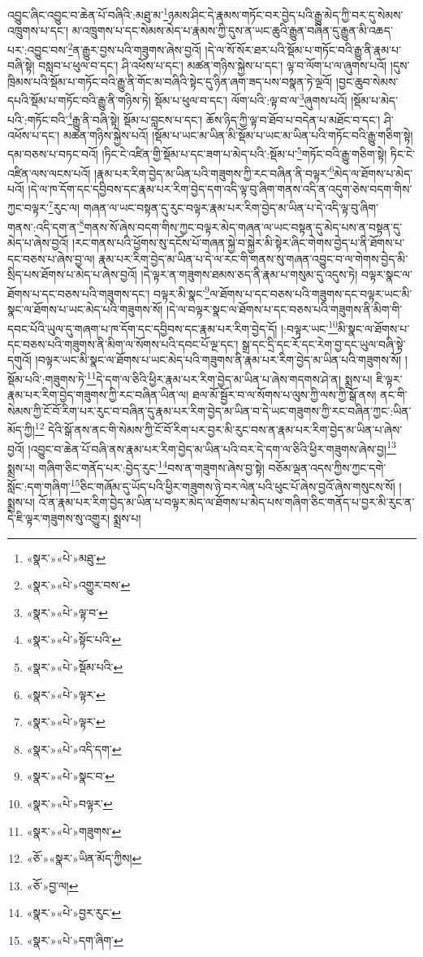 འབྱུང་ཞིང་འབྱུང་བ་ཆེན་པོ་བཞིའི་:མཐུ་མ་\footnote{«སྣར་»«པེ་»མཐུ་}ཉམས་ཤིང་དེ་རྣམས་གཏོང་བར་བྱེད་པའི་རྒྱུ་མེད་ཀྱི་བར་དུ་སེམས་འཁྲུགས་པ་དང་། མ་འཁྲུགས་པ་དང་སེམས་མེད་པ་རྣམས་ཀྱི་དུས་ན་ཡང་ཆུའི་རྒྱུན་བཞིན་དུ་རྒྱུན་མི་འཆད་པར་:འབྱུང་བས་\footnote{«སྣར་»«པེ་»འགྱུར་བས་}ན་རྒྱུར་བྱས་པའི་གཟུགས་ཞེས་བྱའོ། །དེ་ལ་སོ་སོར་ཐར་པའི་སྡོམ་པ་གཏོང་བའི་རྒྱུ་ནི་རྣམ་པ་བཞི་སྟེ། བསླབ་པ་ཕུལ་བ་དང་། ཤི་འཕོས་པ་དང་། མཚན་གཉིས་སྐྱེས་པ་དང་། ལྟ་བ་ལོག་པ་ལ་ཞུགས་པའོ། །དུས་ཁྲིམས་པའི་སྡོམ་པ་གཏོང་བའི་རྒྱུ་ནི་གོང་མ་བཞིའི་སྟེང་དུ་ཉིན་ཞག་ཟད་པས་བསྣན་ཏེ་ལྔའོ། །བྱང་ཆུབ་སེམས་དཔའི་སྡོམ་པ་གཏོང་བའི་རྒྱུ་ནི་གཉིས་ཏེ། སྡོམ་པ་ཕུལ་བ་དང་། ལོག་པའི་:ལྟ་བ་ལ་\footnote{«སྣར་»«པེ་»ལྟ་བ་}ཞུགས་པའོ། །སྡོམ་པ་མེད་པའི་:གཏོང་བའི་\footnote{«སྣར་»«པེ་»སྟོང་པའི་}རྒྱུ་ནི་བཞི་སྟེ། སྡོམ་པ་བླངས་པ་དང་། ཆོས་ཉིད་ཀྱི་ལྟ་བ་ཐོབ་པ་བདེན་པ་མཐོང་བ་དང་། ཤི་འཕོས་པ་དང་། མཚན་གཉིས་སྐྱེས་པའོ། །སྡོམ་པ་ཡང་མ་ཡིན་མི་སྡོམ་པ་ཡང་མ་ཡིན་པའི་གཏོང་བའི་རྒྱུ་གཅིག་སྟེ། དམ་བཅས་པ་བཏང་བའོ། །ཏིང་ངེ་འཛིན་གྱི་སྡོམ་པ་དང་ཟག་པ་མེད་པའི་:སྡོམ་པ་\footnote{«སྣར་»«པེ་»སྡོམ་པའི་}གཏོང་བའི་རྒྱུ་གཅིག་སྟེ། ཏིང་ངེ་འཛིན་ལས་ལངས་པའོ། །རྣམ་པར་རིག་བྱེད་མ་ཡིན་པའི་གཟུགས་ཀྱི་རང་བཞིན་ནི་བལྟར་\footnote{«སྣར་»«པེ་»ལྟར་}མེད་ལ་ཐོགས་པ་མེད་པའོ། །དེ་ལ་ཁ་དོག་དང་དབྱིབས་དང་རྣམ་པར་རིག་བྱེད་དག་འདི་ལྟ་བུ་ཞིག་གནས་འདི་ན་འདུག་ཅེས་བདག་གིས་ཀྱང་བལྟར་\footnote{«སྣར་»«པེ་»ལྟར་}རུང་ལ། གཞན་ལ་ཡང་བསྟན་དུ་རུང་བལྟར་རྣམ་པར་རིག་བྱེད་མ་ཡིན་པ་དེ་འདི་ལྟ་བུ་ཞིག་གནས་:འདི་དག་ན་\footnote{«སྣར་»«པེ་»འདི་དག་}གནས་སོ་ཞེས་བདག་གིས་ཀྱང་བལྟར་མེད་གཞན་ལ་ཡང་བསྟན་དུ་མེད་པས་ན་བསྟན་དུ་མེད་པ་ཞེས་བྱའོ། །རང་གནས་པའི་ཕྱོགས་སུ་དངོས་པོ་གཞན་སྐྱེ་བ་སྐྱེར་མི་སྟེར་ཞིང་གེགས་བྱེད་པ་ནི་ཐོགས་པ་དང་བཅས་པ་ཞེས་བྱ་ལ། རྣམ་པར་རིག་བྱེད་མ་ཡིན་པ་དེ་ལ་རང་གི་གནས་སུ་གཞན་འབྱུང་བ་ལ་གེགས་བྱེད་མི་སྲིད་པས་ཐོགས་པ་མེད་པ་ཞེས་བྱའོ། །དེ་ལྟར་ན་གཟུགས་ཐམས་ཅད་ནི་རྣམ་པ་གསུམ་དུ་འདུས་ཏེ། བལྟར་སྣང་ལ་ཐོགས་པ་དང་བཅས་པའི་གཟུགས་དང་། བལྟར་མི་སྣང་\footnote{«སྣར་»«པེ་»སྣང་བ་}ལ་ཐོགས་པ་དང་བཅས་པའི་གཟུགས་དང་བལྟར་ཡང་མི་སྣང་ལ་ཐོགས་པ་ཡང་མེད་པའི་གཟུགས་སོ། །དེ་ལ་བལྟར་སྣང་ལ་ཐོགས་པ་དང་བཅས་པའི་གཟུགས་ནི་མིག་གི་དབང་པོའི་ཡུལ་དུ་གཞག་པ་ཁ་དོག་དང་དབྱིབས་དང་རྣམ་པར་རིག་བྱེད་དོ། །:བལྟར་ཡང་\footnote{«སྣར་»«པེ་»བལྟར་}མི་སྣང་ལ་ཐོགས་པ་དང་བཅས་པའི་གཟུགས་ནི་མིག་ལ་སོགས་པའི་དབང་པོ་ལྔ་དང་། སྒྲ་དང་དྲི་དང་རོ་དང་རེག་བྱ་དང་ཡུལ་བཞི་སྟེ་དགུའོ། །བལྟར་ཡང་མི་སྣང་ལ་ཐོགས་པ་ཡང་མེད་པའི་གཟུགས་ནི་རྣམ་པར་རིག་བྱེད་མ་ཡིན་པའི་གཟུགས་སོ། །སྡོམ་པའི་:གཟུགས་ཏེ་\footnote{«སྣར་»«པེ་»གཟུགས་}དེ་དག་ལ་ཅིའི་ཕྱིར་རྣམ་པར་རིག་བྱེད་མ་ཡིན་པ་ཞེས་གདགས་ཤེ་ན། སྨྲས་པ། ཇི་ལྟར་རྣམ་པར་རིག་བྱེད་གཟུགས་ཀྱི་རང་བཞིན་ཡིན་ལ། ཐལ་མོ་སྦྱོར་བ་ལ་སོགས་པ་ལུས་ཀྱི་ལས་ཀྱི་སྒོ་ནས། ནང་གི་སེམས་ཀྱི་ངོ་བོ་རིག་པར་རུང་བ་བཞིན་དུ་རྣམ་པར་རིག་བྱེད་མ་ཡིན་བ་དེ་ཡང་གཟུགས་ཀྱི་རང་བཞིན་ཀྱང་:ཡིན་མོད་ཀྱི།\footnote{«ཅོ་»«སྣར་»ཡིན་མོད་ཀྱིས།} དེའི་སྒོ་ནས་ནང་གི་སེམས་ཀྱི་ངོ་བོ་རིག་པར་བྱར་མི་རུང་བས་ན་རྣམ་པར་རིག་བྱེད་མ་ཡིན་པ་ཞེས་བྱའོ། །འབྱུང་བ་ཆེན་པོ་བཞི་ནས་རྣམ་པར་རིག་བྱེད་མ་ཡིན་པའི་བར་དེ་དག་ལ་ཅིའི་ཕྱིར་གཟུགས་ཞེས་བྱ།\footnote{«ཅོ་»བྱ་ལ།} སྨྲས་པ། གཞིག་ཅིང་གནོད་པར་:བྱེད་རུང་\footnote{«སྣར་»«པེ་»བྱར་རུང་}བས་ན་གཟུགས་ཞེས་བྱ་སྟེ། བཅོམ་ལྡན་འདས་ཀྱིས་ཀྱང་དགེ་སློང་:དག་གཞིག་\footnote{«སྣར་»«པེ་»དག་ཞིག་}ཅིང་གཞོམ་དུ་ཡོད་པའི་ཕྱིར་གཟུགས་ཉེ་བར་ལེན་པའི་ཕུང་པོ་ཞེས་བྱའོ་ཞེས་གསུངས་སོ། །སྨྲས་པ། འོ་ན་རྣམ་པར་རིག་བྱེད་མ་ཡིན་པ་བལྟར་མེད་ལ་ཐོགས་པ་མེད་པས་གཞིག་ཅིང་གནོད་པ་བྱར་མི་རུང་ན་དེ་ཇི་ལྟར་གཟུགས་སུ་འགྱུར། སྨྲས་པ། 
